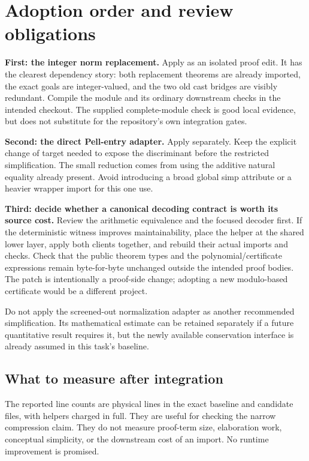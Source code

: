 \section{Adoption order and review obligations}
\label{sec:adoption}
\textbf{First: the integer norm replacement.} Apply  as an isolated proof edit. It has the clearest dependency story: both replacement theorems are already imported, the exact goals are integer-valued, and the two old cast bridges are visibly redundant. Compile the module and its ordinary downstream checks in the intended checkout. The supplied complete-module check is good local evidence, but does not substitute for the repository's own integration gates.

\textbf{Second: the direct Pell-entry adapter.} Apply  separately. Keep the explicit change of target needed to expose the discriminant before the restricted simplification. The small reduction comes from using the additive natural equality already present. Avoid introducing a broad global simp attribute or a heavier wrapper import for this one use.

\textbf{Third: decide whether a canonical decoding contract is worth its source cost.} Review the arithmetic equivalence and the focused decoder first. If the deterministic witness improves maintainability, place the helper at the shared lower layer, apply both clients together, and rebuild their actual imports and checks. Check that the public theorem types and the polynomial/certificate expressions remain byte-for-byte unchanged outside the intended proof bodies. The patch is intentionally a proof-side change; adopting a new modulo-based certificate would be a different project.

Do not apply the screened-out normalization adapter as another recommended simplification. Its mathematical estimate can be retained separately if a future quantitative result requires it, but the newly available conservation interface is already assumed in this task's baseline.

\subsection{What to measure after integration}
The reported line counts are physical lines in the exact baseline and candidate files, with helpers charged in full. They are useful for checking the narrow compression claim. They do not measure proof-term size, elaboration work, conceptual simplicity, or the downstream cost of an import. No runtime improvement is promised.

